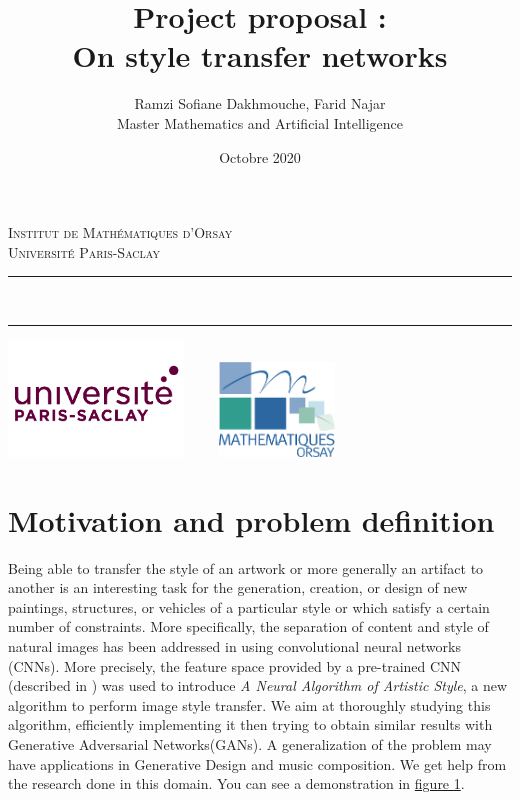 \documentclass[final]{cvpr}
\newcommand{\HRule}{\rule{\linewidth}{0.5mm}}
\begin{document}
	\title{Project proposal :\\On style transfer networks\\}
	\author{
		Ramzi Sofiane Dakhmouche, Farid Najar\\[0.2cm]
		Master Mathematics and Artificial Intelligence}
	\date{Octobre 2020}	
	\makeatletter
	\begin{titlepage}
		\centering
		\textsc{\LARGE Institut de Mathématiques d'Orsay \\ Université Paris-Saclay}\\[4cm]
		\HRule \\
		{ \huge \bfseries \@title[2cm] }
		\begin{Large}
			\@author
		\end{Large}
		\HRule
		\vfill
		\includegraphics[width=0.35\textwidth]{paris-saclay.png}
		\hfill
		\includegraphics[width=0.35\textwidth, height=2.5cm]{imo.png}
		\pagebreak
		\pagebreak
	\end{titlepage}


	\section*{Motivation and problem definition}
	Being able to transfer the style of an artwork or more generally an artifact to another is an interesting task for the generation, creation, or design of new paintings, structures, or vehicles of a particular style or which satisfy a certain number of constraints. More specifically, the separation of content and style of natural images has been addressed in \cite{1} using convolutional neural networks (CNNs). More precisely, the feature space provided by a pre-trained CNN (described in \cite{2}) was used to introduce \emph{A Neural Algorithm of Artistic Style}, a new algorithm to perform image style transfer. We aim at thoroughly  studying this algorithm, efficiently implementing it then trying to obtain similar results with Generative Adversarial Networks(GANs). A generalization of the problem may have applications in Generative Design\cite{7} and music composition. We get help from the research done in this domain\cite{1}\cite{2}\cite{4}. You can see a demonstration in \hyperref[example]{figure 1}.
	
\end{document}
